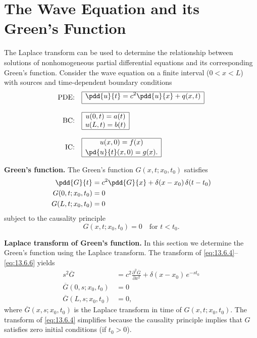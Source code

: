 \section{The Wave Equation and its Green's Function}
\label{sec:13.6}

The Laplace transform can be used to determine the relationship between solutions of nonhomogeneous partial differential equations and its corresponding Green's function.  Consider the wave equation on a finite interval ($0 < x < L$) with sources and time-dependent boundary conditions
\begin{align}
\text{PDE:}\quad &
\begin{array}{|c|}
\hline
\displaystyle\pdd{u}{t} = c^2\pdd{u}{x} + q(x,t) \\[4pt]
\hline
\end{array}
\label{eq:13.6.1} \\[8pt]
\text{BC:}\quad &
\begin{array}{|c|}
\hline
u(0,t) = a(t) \\
u(L,t) = b(t) \\
\hline
\end{array}
\label{eq:13.6.2} \\[8pt]
\text{IC:}\quad &
\begin{array}{|c|}
\hline
u(x,0) = f(x) \\[2pt]
\displaystyle\pd{u}{t}(x,0) = g(x). \\
\hline
\end{array}
\label{eq:13.6.3}
\end{align}

\textbf{Green's function.}
The Green's function $G(x,t;x_0,t_0)$ satisfies
\begin{align}
\pdd{G}{t} &= c^2\pdd{G}{x} + \delta(x-x_0)\,\delta(t-t_0) \label{eq:13.6.4}\\
G(0,t;x_0,t_0) &= 0 \label{eq:13.6.5}\\
G(L,t;x_0,t_0) &= 0 \label{eq:13.6.6}
\end{align}
subject to the causality principle
\begin{equation}
G(x,t;x_0,t_0) = 0 \quad\text{for } t < t_0.
\label{eq:13.6.7}
\end{equation}

\textbf{Laplace transform of Green's function.}
In this section we determine the Green's function using the Laplace transform.  The transform of \eqref{eq:13.6.4}--\eqref{eq:13.6.6} yields
\begin{align}
s^2\overline{G} &= c^2\frac{\partial^2\overline{G}}{\partial x^2} + \delta(x-x_0)\,e^{-st_0} \label{eq:13.6.8}\\
\overline{G}(0,s;x_0,t_0) &= 0 \label{eq:13.6.9}\\
\overline{G}(L,s;x_0,t_0) &= 0, \label{eq:13.6.10}
\end{align}
where $\overline{G}(x,s;x_0,t_0)$ is the Laplace transform in time of $G(x,t;x_0,t_0)$.  The transform of \eqref{eq:13.6.4} simplifies because the causality principle implies that $G$ satisfies zero initial conditions (if $t_0 > 0$).

